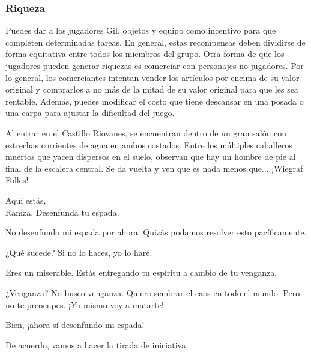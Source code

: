 \subsubsection*{Riqueza}
Puedes dar a los jugadores Gil, objetos y equipo como incentivo para que completen determinadas tareas. En general, estas recompensas deben dividirse de forma equitativa entre todos los miembros del grupo. Otra forma de que los jugadores pueden generar riquezas es comerciar con personajes no jugadores. Por lo general, los comerciantes intentan vender los artículos por encima de su valor original y comprarlos a no más de la mitad de su valor original para que les sea rentable. Además, puedes modificar el costo que tiene descansar en una posada o una carpa para ajustar la dificultad del juego.

\vspace{1cm}

{
\begin{description}[leftmargin=*]
 \item[Yasumi (DJ):] Al entrar en el Castillo Riovanes, se encuentran dentro de un gran salón con estrechas corrientes de agua en ambos costados. Entre los múltiples caballeros muertos que yacen dispersos en el suelo, observan que hay un hombre de pie al final de la escalera central. Se da vuelta y ven que es nada menos que... ¡Wiegraf Folles!
 \item[Yasumi (interpretando a Wiegraf):] Aquí estás,  \\ Ramza. Desenfunda tu espada.
 \item[Akihiko:] No desenfundo mi espada por ahora. Quizás podamos resolver esto pacíficamente.
 \item[Yasumi (interpretando a Wiegraf):] ¿Qué sucede? Si no lo haces, yo lo haré.
 \item[Akihiko (interpretando a Ramza):] Eres un miserable. Estás entregando tu espíritu a cambio de tu venganza.
 \item[Yasumi (interpretando a Wiegraf):] ¿Venganza? No busco venganza. Quiero sembrar el caos en todo el mundo. Pero no te preocupes. ¡Yo mismo voy a matarte!
 \item[Akihiko:] Bien, ¡ahora sí desenfundo mi espada!
 \item[Yasumi:] De acuerdo, vamos a hacer la tirada de iniciativa.
	\end{description}
}

\pagebreak

